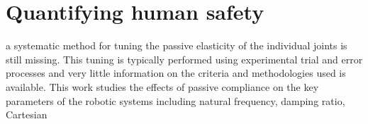 %  
%  
%  




\section{Quantifying human safety}


  
a systematic method for tuning the passive elasticity of the individual joints is still missing. This tuning is typically performed using experimental trial and error processes and very little information on the criteria and methodologies used is available. This work studies the effects of passive compliance on the key parameters of the robotic systems including natural frequency, damping ratio, Cartesian

